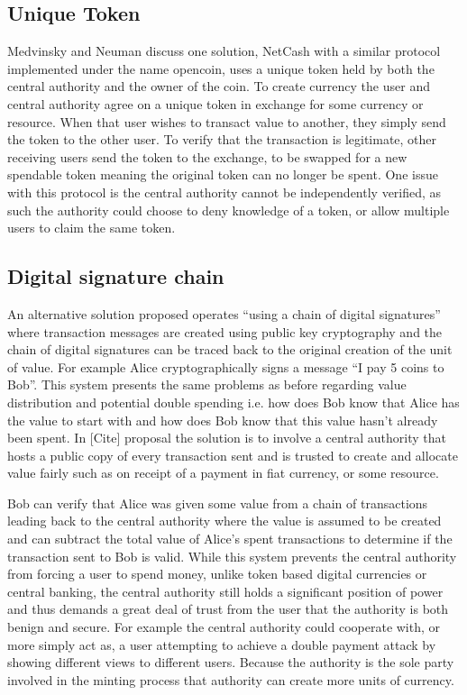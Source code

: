 \subsection{Unique Token} Medvinsky and Neuman\cite{netcash} discuss one solution,
NetCash with a similar protocol implemented under the name opencoin, uses a
unique token held by both the central authority and the owner of the coin. To
create currency the user and central authority agree on a unique token in
exchange for some currency or resource. When that user wishes to transact value
to another, they simply send the token to the other user.  To verify that the
transaction is legitimate, other receiving users send the token to the exchange,
to be swapped for a new spendable token meaning the original token can no longer
be spent. One issue with this protocol is the central authority cannot be
independently verified, as such the authority could choose to deny knowledge of
a token, or allow multiple users to claim the same token.

\subsection{Digital signature chain} An alternative solution proposed operates
``using a chain of digital signatures'' where transaction messages are created
using public key cryptography and the chain of digital signatures can be traced
back to the original creation of the unit of value. For example Alice
cryptographically signs a message ``I pay 5 coins to Bob''.  This system
presents the same problems as before regarding value distribution and potential
double spending i.e. how does Bob know that Alice has the value to start with
and how does Bob know that this value hasn't already been spent. In [Cite]
proposal the solution is to involve a central authority that hosts a public copy
of every transaction sent and is trusted to create and allocate value fairly
such as on receipt of a payment in fiat currency, or some resource.

Bob can verify that Alice was given some value from a chain of transactions
leading back to the central authority where the value is assumed to be created
and can subtract the total value of Alice’s spent transactions to determine if
the transaction sent to Bob is valid.  While this system prevents the central
authority from forcing a user to spend money, unlike token based digital
currencies or central banking, the central authority still holds a significant
position of power and thus demands a great deal of trust from the user that the
authority is both benign and secure. For example the central authority could
cooperate with, or more simply act as, a user attempting to achieve a double
payment attack by showing different views to different users. Because the
authority is the sole party involved in the minting process that authority can
create more units of currency.

